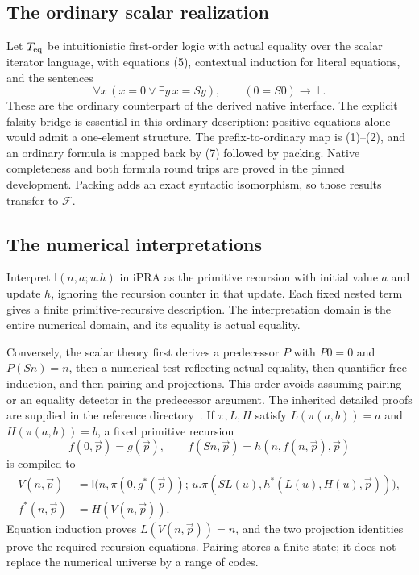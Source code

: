 \documentclass[11pt]{article}
\theoremstyle{definition}\newtheorem{definition}[theorem]{Definition}
\theoremstyle{remark}\newtheorem{remark}[theorem]{Remark}
\newcommand{\I}{\mathsf I}
\newcommand{\F}{\mathcal F}
\newcommand{\Teq}{T_{\rm eq}}
\begin{document}
\subsection{The ordinary scalar realization}

Let $\Teq$ be intuitionistic first-order logic with actual equality over
the scalar iterator language, with equations (5), contextual induction
for literal equations, and the sentences
\[
 \forall x\,(x=0\vee\exists y\,x=Sy),\qquad
 (0=S0)\to\bot.
 \tag{8}\label{eq:coverage}
\]
These are the ordinary counterpart of the derived native interface.
The explicit falsity bridge is essential in this ordinary description:
positive equations alone would admit a one-element structure.
The prefix-to-ordinary map is (1)--(2), and an ordinary formula is mapped
back by (7) followed by packing. Native completeness and both formula
round trips are proved in the pinned development. Packing adds an exact
syntactic isomorphism, so those results transfer to $\F$.

\subsection{The numerical interpretations}

Interpret $\I(n,a;u.h)$ in iPRA as the primitive recursion with initial
value $a$ and update $h$, ignoring the recursion counter in that update.
Each fixed nested term gives a finite primitive-recursive description.
The interpretation domain is the entire numerical domain, and its
equality is actual equality.

Conversely, the scalar theory first derives a predecessor $P$ with
$P0=0$ and $P(Sn)=n$, then a numerical test reflecting actual equality,
then quantifier-free induction, and then pairing and projections.
This order avoids assuming pairing or an equality detector in the
predecessor argument. The inherited detailed proofs are supplied in the
reference directory~\cite{bridge}.
If $\pi,L,H$ satisfy
$L(\pi(a,b))=a$ and $H(\pi(a,b))=b$, a fixed primitive recursion
\[
 f(0,\vec p)=g(\vec p),\qquad
 f(Sn,\vec p)=h(n,f(n,\vec p),\vec p)
\]
is compiled to
\[
\begin{aligned}
 V(n,\vec p)&=\I\bigl(n,\pi(0,g^*(\vec p));\,
 u.\pi(SL(u),h^*(L(u),H(u),\vec p))\bigr),\\
 f^*(n,\vec p)&=H(V(n,\vec p)).
\end{aligned}
\tag{9}\label{eq:compiler}
\]
Equation induction proves $L(V(n,\vec p))=n$, and the two projection
identities prove the required recursion equations. Pairing stores a
finite state; it does not replace the numerical universe by a range
of codes.
\end{document}

